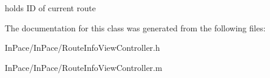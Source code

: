 holds I\-D of current route 

The documentation for this class was generated from the following files\-:\begin{DoxyCompactItemize}
\item 
In\-Pace/\-In\-Pace/Route\-Info\-View\-Controller.\-h\item 
In\-Pace/\-In\-Pace/Route\-Info\-View\-Controller.\-m\end{DoxyCompactItemize}
